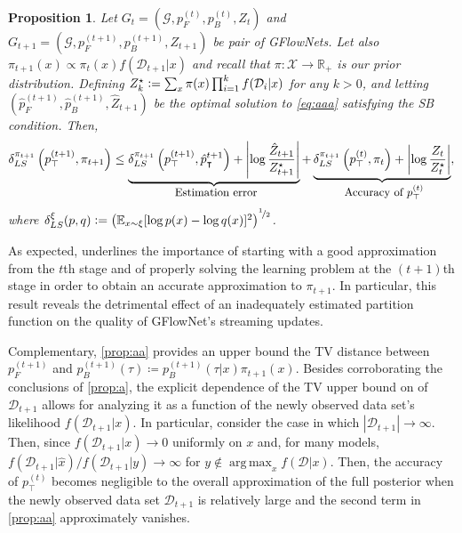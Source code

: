 \documentclass{article}
\DeclareMathOperator*{\argmax}{arg\,max}
\theoremstyle{plain}
\newtheorem{proposition}{Proposition}
\theoremstyle{definition}
\theoremstyle{remark}
\theoremstyle{remark}
\newcommand{\defeq}{\vcentcolon=}
\begin{document}
\begin{proposition} \label{prop:a} 
    Let ${G}_{t} = (\mathcal{G},p_{F}^{(t)}, p_{B}^{(t)}, Z_{t})$ and ${G}_{t+1} = (\mathcal{G}, p_{F}^{(t+1)}, p_{B}^{(t+1)}, Z_{t+1})$ be pair of GFlowNets. Let also $\pi_{t+1}(x) \propto \pi_{t}(x) f(\mathcal{D}_{t+1} | x)$ and recall that $\pi \colon \mathcal{X} \rightarrow \mathbb{R}_{+}$ is our prior distribution. Defining ${Z}_{k}^\star \defeq \sum_x \pi(x) \prod_{i=1}^{k} f(\mathcal{D}_{i} | x)$ for any $k>0$, and letting $(\hat{p}_F^{(t+1)}, \hat{p}_B^{(t+1)}, \hat{Z}_{t+1})$ be the optimal solution to \autoref{eq:aaa} satisfying the SB condition.
%
    Then, 
    \begin{equation*}
        \delta_{LS}^{\pi_{t + 1}}\left(p_{\top}^{(t + 1)}, \pi_{t + 1} \right) \le \underbrace{\delta_{LS}^{\pi_{t + 1}}\left(p_{\top}^{(t + 1)}, \hat{p}_{\intercal}^{t + 1}\right) + \left| \log \frac{\hat{Z}_{t + 1}}{Z_{t + 1}^{\star}} \right|}_{\let\scriptstyle\displaystyle\substack{\text{\small Estimation error}}} + \underbrace{\delta_{LS}^{\pi_{t + 1}}\left(p_{\top}^{(t)}, \pi_{t} \right) +  \left| \log \frac{Z_{t}}{Z_{t}^{\star}} \right|}_{\let\scriptstyle\displaystyle\substack{\text{\small Accuracy of $p_{\top}^{(t)}$}}},  
    \end{equation*}
    where $\delta_{LS}^{\xi}(p, q) \defeq \left(\mathbb{E}_{x \sim \xi} [\log p(x) - \log q(x)]^{2}\right)^{\nicefrac{1}{2}}$.
\end{proposition}
% 

As expected,  underlines the importance of starting with a good approximation from the $t$th stage and of properly solving the learning problem at the $(t + 1)$th stage in order to obtain an accurate approximation to $\pi_{t + 1}$. In particular, this result reveals the detrimental effect of an inadequately estimated partition function on the quality of GFlowNet's streaming updates. 
%


Complementary, \autoref{prop:aa} provides an upper bound the TV distance between $p_{F}^{(t + 1)}$ and $p_{B}^{(t + 1)}(\tau) \coloneqq p_{B}^{(t + 1)}(\tau | x) \pi_{t + 1}(x)$. Besides corroborating the conclusions of \autoref{prop:a}, the explicit dependence of the TV upper bound on of $\mathcal{D}_{t + 1}$ allows for analyzing it as a function of the newly observed data set's likelihood $f(\mathcal{D}_{t + 1} | x)$. In particular, consider the case in which $|\mathcal{D}_{t+1}| \rightarrow \infty$. Then, since $f(\mathcal{D}_{t + 1} | x) \rightarrow 0$ uniformly on $x$ and, for many models, ${f(\mathcal{D}_{t + 1} | \hat{x})}/{f(\mathcal{D}_{t + 1} | y)} \rightarrow \infty$ for $y \notin \argmax_{x} f(\mathcal{D} | x)$. Then, the accuracy of $p_{\top}^{(t)}$ becomes negligible to the overall approximation of the full posterior when the newly observed data set $\mathcal{D}_{t + 1}$ is relatively large and the second term in \autoref{prop:aa} approximately vanishes. 
\end{document}
